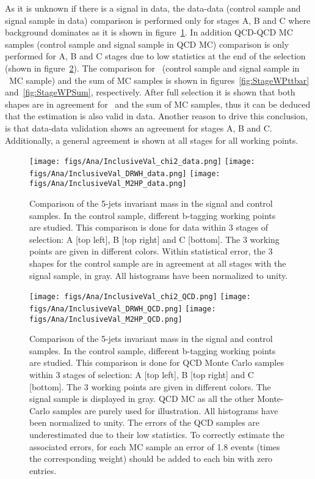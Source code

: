 As it is unknown if there is a signal in data, the data-data (control sample and signal sample in data) comparison is performed only for stages A, B and C where background dominates as it is shown in figure~\ref{fig:StageWPData}. In addition QCD-QCD MC samples (control sample and signal sample in QCD MC) comparison is only performed for A, B and C stages due to low statistics at the end of the selection (shown in figure~\ref{fig:StageWPQCD}). The comparison for \ttbar~(control sample and signal sample in \ttbar~MC sample) and the sum of MC samples is shown in figures~\ref{fig:StageWPttbar} and~\ref{fig:StageWPSum}, respectively. After full selection it is shown that both shapes are in agreement for \ttbar~and the sum of MC samples, thus it can be deduced that the estimation is also valid in data. Another reason to drive this conclusion, is that data-data validation shows an agreement for stages A, B and C. Additionally, a general agreement is shown at all stages for all working points.

\begin{figure}[!Hhtbp]
  \begin{center}
    \texttt{[image: figs/Ana/InclusiveVal\_chi2\_data.png]}
    \texttt{[image: figs/Ana/InclusiveVal\_DRWH\_data.png]}
    \texttt{[image: figs/Ana/InclusiveVal\_M2HP\_data.png]}
    \caption{Comparison of the 5-jets invariant mass in the signal and control samples. In the control sample, different b-tagging working points are studied. This comparison is done for data within 3 stages of selection: A [top left], B [top right] and C [bottom]. The 3 working points are given in different colors. Within statistical error, the 3 shapes for the control sample are in agreement at all stages with the signal sample, in gray. All histograms have been normalized to unity.}
    \label{fig:StageWPData}
  \end{center}
\end{figure}

\begin{figure}[!Hhtbp]
  \begin{center}
    \texttt{[image: figs/Ana/InclusiveVal\_chi2\_QCD.png]}
    \texttt{[image: figs/Ana/InclusiveVal\_DRWH\_QCD.png]}
    \texttt{[image: figs/Ana/InclusiveVal\_M2HP\_QCD.png]}
    \caption{Comparison of the 5-jets invariant mass in the signal and control samples. In the control sample, different b-tagging working points are studied. This comparison is done for QCD Monte Carlo samples within 3 stages of selection: A [top left], B [top right] and C [bottom]. The 3 working points are given in different colors. The signal sample is displayed in gray. QCD MC as all the other Monte-Carlo samples are purely used for illustration. All histograms have been normalized to unity. The errors of the QCD samples are underestimated due to their low statistics. To correctly estimate the associated errors, for each MC sample an error of 1.8 events (times the corresponding weight) should be added to each bin with zero entries.}
    \label{fig:StageWPQCD}
  \end{center}
\end{figure}

